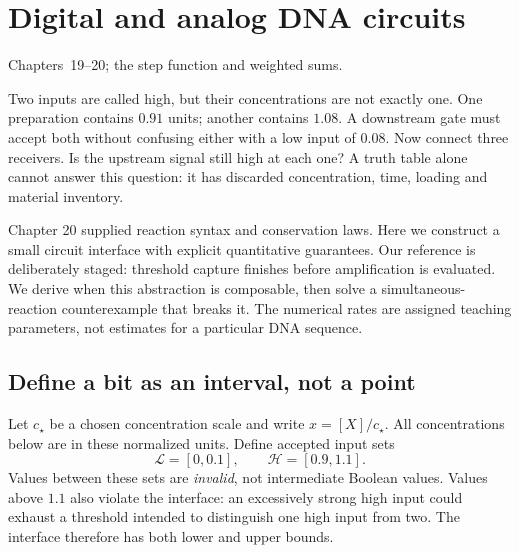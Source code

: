 \chapter{Digital and analog DNA circuits}
{Chapters~19--20; the step function and weighted sums.}

Two inputs are called high, but their concentrations are not exactly one.
One preparation contains $0.91$ units; another contains $1.08$. A downstream
gate must accept both without confusing either with a low input of $0.08$.
Now connect three receivers. Is the upstream signal still high at each one?
A truth table alone cannot answer this question: it has discarded concentration,
time, loading and material inventory.

Chapter 20 supplied reaction syntax and conservation laws. Here we construct a
small circuit interface with explicit quantitative guarantees. Our reference
is deliberately staged: threshold capture finishes before amplification is
evaluated. We derive when this abstraction is composable, then solve a
simultaneous-reaction counterexample that breaks it. The numerical rates are
assigned teaching parameters, not estimates for a particular DNA sequence.

\section{Define a bit as an interval, not a point}

Let $c_\star$ be a chosen concentration scale and write $x=[X]/c_\star$.
All concentrations below are in these normalized units. Define accepted input
sets
\begin{equation}
 \mathcal L=[0,0.1],\qquad \mathcal H=[0.9,1.1].
 \label{eq:bands}
\end{equation}
Values between these sets are \emph{invalid}, not intermediate Boolean values.
Values above $1.1$ also violate the interface: an excessively strong high input
could exhaust a threshold intended to distinguish one high input from two.
The interface therefore has both lower and upper bounds.

